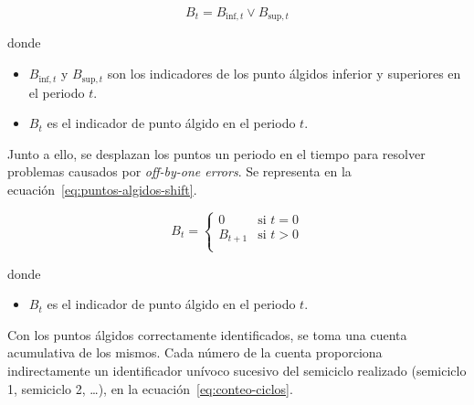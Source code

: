 \begin{samepage}

  \begin{equation}
    \label{eq:puntos-algidos}
    B_{t} = B_{\text{inf}, t} \lor B_{\text{sup}, t}
  \end{equation}

  donde

  \begin{itemize}

    \item \( B_{\text{inf}, t} \) y \( B_{\text{sup}, t} \) son los indicadores de los punto álgidos inferior y superiores en el periodo \( t \).

    \item \( B_{t} \) es el indicador de punto álgido en el periodo \( t \).

  \end{itemize}

\end{samepage}

Junto a ello, se desplazan los puntos un periodo en el tiempo para resolver problemas causados por \textit{off-by-one errors}. Se representa en la ecuación~\ref{eq:puntos-algidos-shift}.

\begin{samepage}

  \begin{equation}
    \label{eq:puntos-algidos-shift}
    B_t =
    \begin{cases}
      0       & \text{si } t = 0 \\
      B_{t+1} & \text{si } t > 0 \\
    \end{cases}
  \end{equation}

  donde

  \begin{itemize}

    \item \( B_{t} \) es el indicador de punto álgido en el periodo \( t \).

  \end{itemize}

\end{samepage}

Con los puntos álgidos correctamente identificados, se toma una cuenta acumulativa de los mismos. Cada número de la cuenta proporciona indirectamente un identificador unívoco sucesivo del semiciclo realizado (semiciclo 1, semiciclo 2, \ldots), en la ecuación~\ref{eq:conteo-ciclos}.

